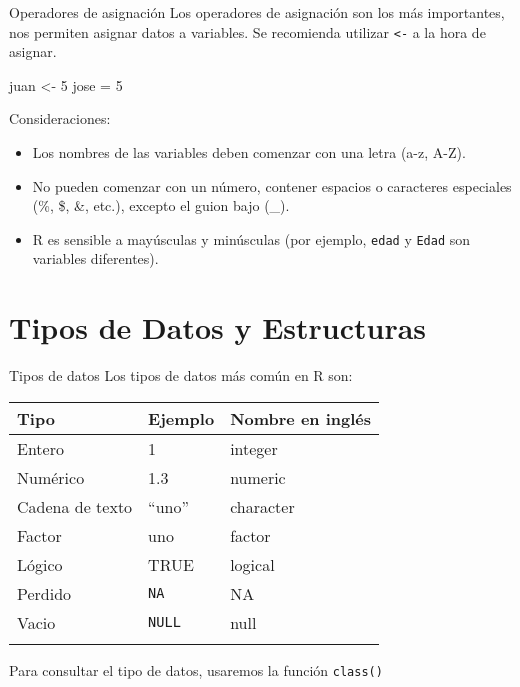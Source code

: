 \documentclass[
  ignorenonframetext,
]{beamer}
\newenvironment{Shaded}{\begin{snugshade}}{\end{snugshade}}
\newcommand{\DecValTok}[1]{\textcolor[rgb]{0.00,0.00,0.81}{#1}}
\newcommand{\NormalTok}[1]{#1}
\newcommand{\OtherTok}[1]{\textcolor[rgb]{0.56,0.35,0.01}{#1}}
\begin{document}
\begin{frame}[fragile]{Operadores de asignación}
\label{operadores-de-asignaciuxf3n}
Los operadores de asignación son los más importantes, nos permiten
asignar datos a variables. Se recomienda utilizar \texttt{\textless{}-}
a la hora de asignar.

\begin{Shaded}
\begin{Highlighting}[]
\NormalTok{juan }\OtherTok{\textless{}{-}} \DecValTok{5}
\NormalTok{jose }\OtherTok{=}  \DecValTok{5}
\end{Highlighting}
\end{Shaded}

\begin{block}{Consideraciones:}
\label{consideraciones}
\begin{itemize}
\item
  Los nombres de las variables deben comenzar con una letra (a-z, A-Z).
\item
  No pueden comenzar con un número, contener espacios o caracteres
  especiales (\%, \$, \&, etc.), excepto el guion bajo (\_).
\item
  R es sensible a mayúsculas y minúsculas (por ejemplo, \texttt{edad} y
  \texttt{Edad} son variables diferentes).
\end{itemize}
\end{block}
\end{frame}

\section{Tipos de Datos y
Estructuras}\label{tipos-de-datos-y-estructuras}

\begin{frame}[fragile]{Tipos de datos}
\label{tipos-de-datos}
Los tipos de datos más común en R son:

\begin{longtable}[]{@{}lll@{}}
\toprule\noalign{}
Tipo & Ejemplo & Nombre en inglés \\
\midrule\noalign{}
\endhead
Entero & 1 & integer \\
Numérico & 1.3 & numeric \\
Cadena de texto & ``uno'' & character \\
Factor & uno & factor \\
Lógico & TRUE & logical \\
Perdido & \texttt{NA} & NA \\
Vacio & \texttt{NULL} & null \\
\bottomrule\noalign{}
\end{longtable}

Para consultar el tipo de datos, usaremos la función \texttt{class()}
\end{frame}
\end{document}
